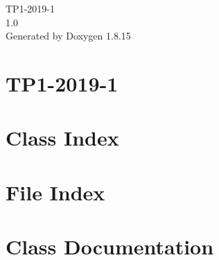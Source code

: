 \let\mypdfximage\pdfximage\def\pdfximage{\immediate\mypdfximage}\documentclass[twoside]{book}
\newcommand{\+}{\discretionary{\mbox{\scriptsize$\hookleftarrow$}}{}{}}
\newcommand{\clearemptydoublepage}{%
  \newpage{\pagestyle{empty}\cleardoublepage}%
}
\begin{document}
\hypersetup{pageanchor=false,
             bookmarksnumbered=true,
             pdfencoding=unicode
            }
\begin{titlepage}
\vspace*{7cm}
\begin{center}%
{\Large T\+P1-\/2019-\/1 \\[1ex]\large 1.\+0 }\\
\vspace*{1cm}
{\large Generated by Doxygen 1.8.15}\\
\end{center}
\end{titlepage}
\clearemptydoublepage
{}
\tableofcontents
\clearemptydoublepage
{}
\hypersetup{pageanchor=true}

\chapter{T\+P1-\/2019-\/1}
\label{md__r_e_a_d_m_e}

\chapter{Class Index}

\chapter{File Index}

\chapter{Class Documentation}























\end{document}
